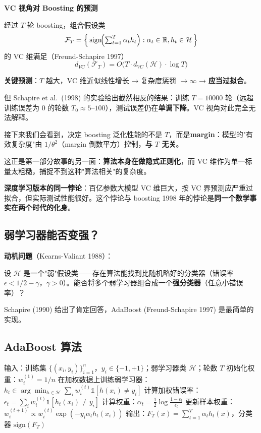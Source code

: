 \documentclass[12pt, a4paper]{ctexart}
\begin{document}
\textbf{VC 视角对 Boosting 的预测}

经过 $T$ 轮 boosting，组合假设类
\[
\mathcal{F}_T = \left\{\,\text{sign}\!\Bigl(\textstyle\sum_{t=1}^T \alpha_t h_t\Bigr) : \alpha_t \in \mathbb{R}, h_t \in \mathcal{H}\,\right\}
\]
的 VC 维满足（Freund-Schapire 1997）
\[
d_{VC}(\mathcal{F}_T) = O\bigl(T \cdot d_{VC}(\mathcal{H}) \cdot \log T\bigr)
\]

\textbf{关键预测}：$T$ 越大，VC 维近似线性增长 → 复杂度惩罚 $\to \infty$ → \textbf{应当过拟合}。

\begin{insight}[即将出现的矛盾]
但 Schapire et al.\ (1998) 的实验给出截然相反的结果：训练 $T = 10000$ 轮（远超训练误差为 0 的轮数 $T_0 \approx 5\text{--}100$），测试误差仍在\textbf{单调下降}。VC 视角对此完全无法解释。

接下来我们会看到，决定 boosting 泛化性能的不是 $T$，而是\textbf{margin}：模型的"有效复杂度"由 $1/\theta^2$（margin 倒数平方）控制，\textbf{与 $T$ 无关}。

这正是第一部分故事的另一面：\textbf{算法本身在做隐式正则化}，而 VC 维作为单一标量太粗糙，捕捉不到这种"算法相关"的复杂度。

\textbf{深度学习版本的同一悖论}：百亿参数大模型 VC 维巨大，按 VC 界预测应严重过拟合，但实际测试性能很好。这个悖论与 boosting 1998 年的悖论是\textbf{同一个数学事实在两个时代的化身}。
\end{insight}

\subsection{弱学习器能否变强？}

\textbf{动机问题}（Kearns-Valiant 1988）：

设 $\mathcal{H}$ 是一个"弱"假设类——存在算法能找到比随机略好的分类器（错误率 $\epsilon < 1/2 - \gamma$，$\gamma > 0$）。能否将多个弱学习器组合成一个\textbf{强分类器}（任意小错误率）？

Schapire (1990) 给出了肯定回答，AdaBoost (Freund-Schapire 1997) 是最简单的实现。

\subsection{AdaBoost 算法}

\begin{algorithm}
\caption{AdaBoost}
\begin{algorithmic}[1]
\STATE 输入：训练集 $\{(x_i, y_i)\}_{i=1}^n$，$y_i \in \{-1, +1\}$；弱学习器类 $\mathcal{H}$；轮数 $T$
\STATE 初始化权重：$w_i^{(1)} = 1/n$
    \STATE 在加权数据上训练弱学习器：$h_t \in \arg\min_{h \in \mathcal{H}} \sum_i w_i^{(t)} \mathbb{1}[h(x_i) \neq y_i]$
    \STATE 计算加权错误率：$\epsilon_t = \sum_i w_i^{(t)} \mathbb{1}[h_t(x_i) \neq y_i]$
    \STATE 计算权重：$\alpha_t = \frac{1}{2}\log\frac{1-\epsilon_t}{\epsilon_t}$
    \STATE 更新样本权重：$w_i^{(t+1)} \propto w_i^{(t)} \exp(-y_i \alpha_t h_t(x_i))$
\ENDFOR
\STATE 输出：$F_T(x) = \sum_{t=1}^{T} \alpha_t h_t(x)$，分类器 $\text{sign}(F_T)$
\end{algorithmic}
\end{algorithm}
\end{document}
